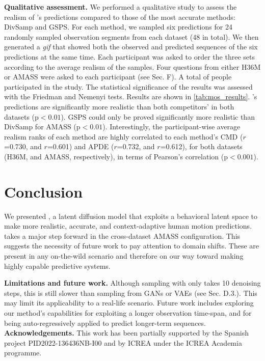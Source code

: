 \documentclass[10pt,twocolumn,letterpaper]{article}
\begin{document}
\textbf{Qualitative assessment.} We performed a qualitative study to assess the realism of \modelname{}'s predictions compared to those of the most accurate methods: DivSamp and GSPS. For each method, we sampled six predictions for 24 randomly sampled observation segments from each dataset (48 in total). We then generated a \textit{gif} that showed both the observed and predicted sequences of the six predictions at the same time. Each participant was asked to order the three sets according to the average realism of the samples. Four questions from either H36M or AMASS were asked to each participant (see \supp{} Sec. F). 
A total of \participants{} people participated in the study. The statistical significance of the results was assessed with the Friedman and Nemenyi tests. Results are shown in \autoref{tab:mos_results}. \modelname{}'s predictions are significantly more realistic than both competitors' in both datasets (p${<}0.01$). GSPS could only be proved significantly more realistic than DivSamp for AMASS (p${<}0.01$). Interestingly, the participant-wise average realism ranks of each method are highly correlated to each method's CMD ($r$=0.730, and $r$=0.601) and APDE ($r$=0.732, and $r$=0.612), for both datasets (H36M, and AMASS, respectively), in terms of Pearson's correlation (p${<}0.001$).
 \vspace{-0.3cm}
\section{Conclusion}
\label{sec:conclusions}
\vspace{-0.2cm}
We presented \modelname{}, a latent diffusion model that exploits a behavioral latent space to make more realistic, accurate, and context-adaptive human motion predictions. \modelname{} takes a major step forward in the cross-dataset AMASS configuration. This suggests the necessity of future work to pay attention to domain shifts. These are present in any on-the-wild scenario and therefore on our way toward making highly capable predictive systems.

\textbf{Limitations and future work.} Although sampling with \modelname{} only takes 10 denoising steps, this is still slower than sampling from GANs or VAEs (see \supp{} Sec. D.3.). This may limit its applicability to a real-life scenario. Future work includes exploring our method's capabilities for exploiting a longer observation time-span, and for being auto-regressively applied to predict longer-term sequences. 
\textbf{Acknowledgements. }
This work has been partially supported by the Spanish project PID2022-136436NB-I00 and by ICREA under the ICREA Academia programme.
\end{document}
